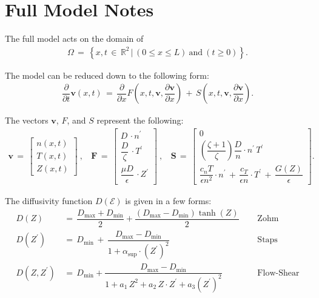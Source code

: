 \documentclass[a4paper,10pt]{article}
\date{}
\begin{document}
\hypertarget{full-model-notes}{%
\section{Full Model Notes}\label{full-model-notes}}

The full model acts on the domain of \begin{align}
    \Omega \,=\, \left\{x, t \,\in\, \mathbb{R}^2 \,|\, (0 \leq x \leq L) ~\text{and}~ (t \geq 0)\right\}.
\end{align}

The model can be reduced down to the following form: \begin{align}
    \dfrac{\partial}{\partial t} \mathbf{v}(x,t) \,=\, \dfrac{\partial}{\partial x} F\left(x, t, \mathbf{v}, \dfrac{\partial\mathbf{v}}{\partial x}\right) \,+\, S\left(x, t, \mathbf{v}, \dfrac{\partial\mathbf{v}}{\partial x}\right).
\end{align}

The vectors \(\mathbf{v}\), \(F\), and \(S\) represent the following:
\begin{align}
\mathbf{v} \,=\,\begin{bmatrix} n(x, t) \\ T(x, t) \\ Z(x, t) \end{bmatrix}~,~~~~
\mathbf{F} \,=\, \begin{bmatrix}
            D\,\cdot n^\prime \\[1ex]
            \dfrac{D}{\zeta}\,\cdot T^\prime \\[2ex]
            \dfrac{\mu D}{\epsilon}\,\cdot Z^\prime
            \end{bmatrix}~,~~~~
\mathbf{S} \,=\, \begin{bmatrix}
            0 \\[1ex]
            \left(\dfrac{\zeta + 1}{\zeta}\right) \dfrac{D}{n} \cdot n^\prime \, T^\prime \\[2ex]
            \dfrac{c_n T}{\epsilon n^2} \cdot n^\prime \,+\, \dfrac{c_T}{\epsilon n} \cdot T^\prime \,+\, \dfrac{G(Z)}{\epsilon}
            \end{bmatrix}.
\end{align}

The diffusivity function \(D(\mathcal{E})\) is given in a few forms:
\begin{align}
    D(Z) \,&=\, \dfrac{D_\text{max} + D_\text{min}}{2} + \dfrac{(D_\text{max} - D_\text{min})\tanh(Z)}{2} ~~~~~~ &\text{Zohm} \\
    D(Z^\prime) \,&=\, D_\text{min} \,+\, \dfrac{D_\text{max} - D_\text{min}}{1 + \alpha_\text{sup}\cdot(Z^\prime)^2} ~~~~~~ &\text{Staps} \\
    D(Z, Z^\prime) \,&=\, D_\text{min} + \dfrac{D_\text{max} - D_\text{min}}{1 + a_1\,Z^2 + a_2\,Z \cdot Z^\prime + a_3\left(Z^\prime\right)^2} ~~~~~~ &\text{Flow-Shear}
\end{align}
\end{document}
